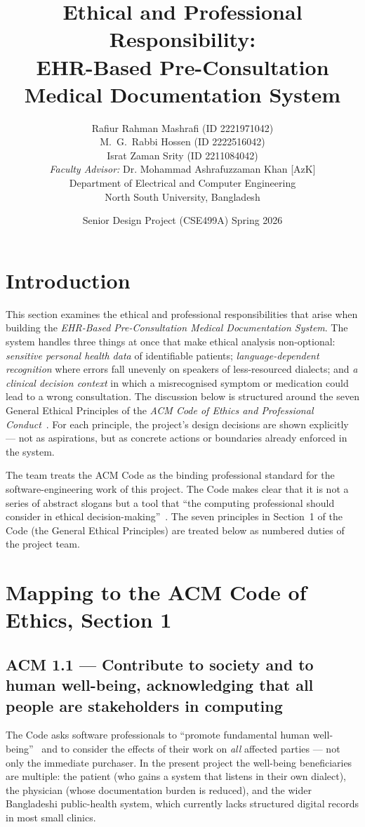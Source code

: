 \documentclass[12pt,a4paper]{article}
\title{\bfseries Ethical and Professional Responsibility:\\
EHR-Based Pre-Consultation Medical Documentation System}
\author{Rafiur Rahman Mashrafi (ID 2221971042)\\
        M.~G.~Rabbi Hossen (ID 2222516042)\\
        Israt Zaman Srity (ID 2211084042)\\[6pt]
        \emph{Faculty Advisor:} Dr. Mohammad Ashrafuzzaman Khan [AzK]\\
        Department of Electrical and Computer Engineering\\
        North South University, Bangladesh}
\date{Senior Design Project (CSE499A) \quad Spring 2026}
\begin{document}
\maketitle

\section{Introduction}

This section examines the ethical and professional responsibilities
that arise when building the
\textit{EHR-Based Pre-Consultation Medical Documentation System}.
The system handles three things at once that make ethical analysis
non-optional: \textit{sensitive personal health data} of identifiable
patients; \textit{language-dependent recognition} where errors fall
unevenly on speakers of less-resourced dialects; and \textit{a
clinical decision context} in which a misrecognised symptom or
medication could lead to a wrong consultation. The discussion below
is structured around the seven General Ethical Principles of the
\textit{ACM Code of Ethics and Professional Conduct}~\cite{eth:acm2018}.
For each principle, the project's design decisions are shown
explicitly --- not as aspirations, but as concrete actions or
boundaries already enforced in the system.

The team treats the ACM Code as the binding professional standard
for the software-engineering work of this project. The Code makes
clear that it is not a series of abstract slogans but a tool that
``the computing professional should consider in
ethical decision-making''~\cite{eth:acm2018}. The seven principles
in Section~1 of the Code (the General Ethical Principles) are
treated below as numbered duties of the project team.

\section{Mapping to the ACM Code of Ethics, Section 1}

\subsection{ACM 1.1 --- Contribute to society and to human well-being,
acknowledging that all people are stakeholders in computing}

The Code asks software professionals to ``promote fundamental human
well-being''~\cite{eth:acm2018} and to consider the effects of their
work on \emph{all} affected parties --- not only the immediate
purchaser. In the present project the well-being beneficiaries are
multiple: the patient (who gains a system that listens in their own
dialect), the physician (whose documentation burden is reduced), and
the wider Bangladeshi public-health system, which currently lacks
structured digital records in most small clinics.
\end{document}
